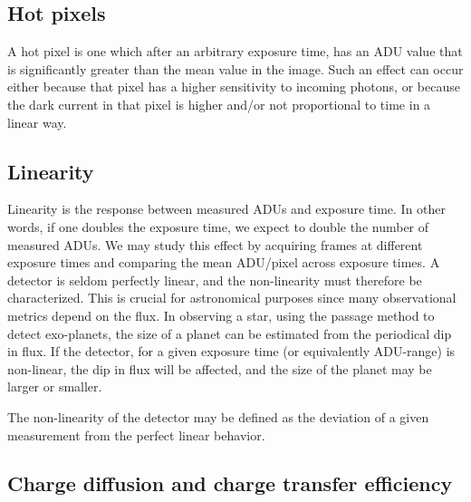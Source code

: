 \documentclass[../main.tex]{subfiles}
\begin{document}
	\subsection{Hot pixels}
	A hot pixel is one which after an arbitrary exposure time, has an ADU value that is significantly greater than the mean value in the image. Such an effect can occur either because that pixel has a higher sensitivity to incoming photons, or because the dark current in that pixel is higher and/or not proportional to time in a linear way. %
	
	\subsection{Linearity}
	Linearity is the response between measured ADUs and exposure time. In other words, if one doubles the exposure time, we expect to double the number of measured ADUs. We may study this effect by acquiring frames at different exposure times and comparing the mean ADU/pixel across exposure times. A detector is seldom perfectly linear, and the non-linearity must therefore be characterized. This is crucial for astronomical purposes since many observational metrics depend on the flux. In observing a star, using the passage method to detect exo-planets, the size of a planet can be estimated from the periodical dip in flux. If the detector, for a given exposure time (or equivalently ADU-range) is non-linear, the dip in flux will be affected, and the size of the planet may be larger or smaller. 
	
	The non-linearity of the detector may be defined as the deviation of a given measurement from the perfect linear behavior.
	
	\subsection{Charge diffusion and charge transfer efficiency}
	
	
\end{document}
